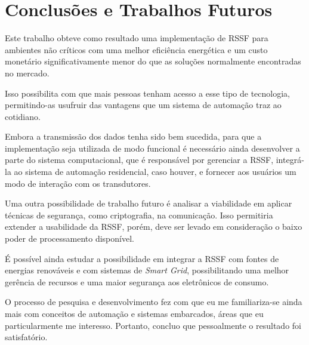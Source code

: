 \chapter{Conclusões e Trabalhos Futuros}
\label{cap:conclusao}
Este trabalho obteve como resultado uma implementação de RSSF para ambientes não críticos com uma melhor
eficiência energética e um custo monetário significativamente menor do que as soluções normalmente encontradas
no mercado.

Isso possibilita com que mais pessoas tenham acesso a esse tipo de tecnologia, permitindo-as usufruir das
vantagens que um sistema de automação traz ao cotidiano.

Embora a transmissão dos dados tenha sido bem sucedida, para que a implementação seja utilizada de modo
funcional é necessário ainda desenvolver a parte do sistema computacional, que é responsável por gerenciar a
RSSF, integrá-la ao sistema de automação residencial, caso houver, e fornecer aos usuários um modo de
interação com os transdutores.

Uma outra possibilidade de trabalho futuro é analisar a viabilidade em aplicar técnicas de segurança, como
criptografia, na comunicação. Isso permitiria extender a usabilidade da RSSF, porém, deve ser levado em
consideração o baixo poder de processamento disponível.

É possível ainda estudar a possibilidade em integrar a RSSF com fontes de energias renováveis e com sistemas
de \textit{Smart Grid}, possibilitando uma melhor gerência de recursos e uma maior segurança aos eletrônicos
de consumo.

O processo de pesquisa e desenvolvimento fez com que eu me familiariza-se ainda mais com conceitos de
automação e sistemas embarcados, áreas que eu particularmente me interesso. Portanto, concluo que pessoalmente
o resultado foi satisfatório.
